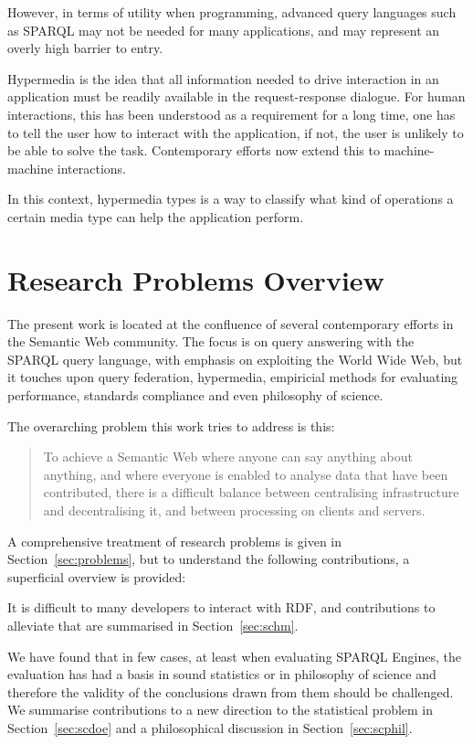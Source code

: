 However, in terms of utility when programming, advanced query
languages such as SPARQL may not be needed for many applications, and
may represent an overly high barrier to entry.

Hypermedia is the idea that all information needed to drive
interaction in an application must be readily available in the
request-response dialogue. For human interactions, this has been
understood as a requirement for a long time, one has to tell the user
how to interact with the application, if not, the user is unlikely to
be able to solve the task. Contemporary efforts now extend this to
machine-machine interactions. 

In this context, hypermedia types is a way to classify what kind of
operations a certain media type can help the application perform.

\section{Research Problems Overview}\label{sec:problemsum}

The present work is located at the confluence of several contemporary
efforts in the Semantic Web community. The focus is on query answering
with the SPARQL query language, with emphasis on exploiting the World
Wide Web, but it touches upon query federation, hypermedia, empiricial
methods for evaluating performance, standards compliance and even
philosophy of science.

The overarching problem this work tries to address is this:

\begin{framed}
\begin{quote}
To achieve a Semantic Web where anyone can say anything about
anything, and where everyone is enabled to analyse data that have been
contributed, there is a difficult balance between centralising
infrastructure and decentralising it, and between processing on
clients and servers.
\end{quote}
\end{framed}

A comprehensive treatment of research problems is given in
Section~\ref{sec:problems}, but to understand the following
contributions, a superficial overview is provided:

It is difficult to many developers to interact with RDF, and
contributions to alleviate that are summarised in
Section~\ref{sec:schm}. 

We have found that in few cases, at least when evaluating SPARQL
Engines, the evaluation has had a basis in sound statistics or in
philosophy of science and therefore the validity of the conclusions
drawn from them should be challenged. We summarise contributions to a
new direction to the statistical problem in Section~\ref{sec:scdoe}
and a philosophical discussion in Section~\ref{sec:scphil}.

